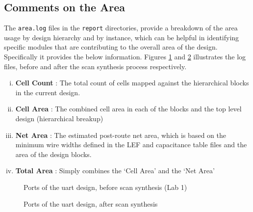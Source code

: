 \documentclass[a4paper,11pt]{article}%
\begin{document}
\subsection{Comments on the Area}

The {\tt area.log} files in the {\tt report} directories, provide a breakdown of the area usage by design hierarchy and by instance, which can be helpful in identifying specific modules that are contributing to the overall area of the design. Specifically it provides the below information\cite{genus_command_ref_2019}. Figures \ref{fig:area_lab1} and \ref{fig:area_after_scan_synthesis} illustrates the log files, before and after the scan synthesis process respectively.

\begin{enumerate}[i.]
	\item \textbf{{Cell Count}} : The total count of cells mapped against the hierarchical blocks in the current design.
	
	\item \textbf{{Cell Area}} : The combined cell area in each of the blocks and the top level design (hierarchical breakup)
	
	\item \textbf{{Net Area}} : The estimated post-route net area, which is based on the minimum wire widths defined in the LEF and capacitance table files and the area of the design blocks.
	
	\item \textbf{{Total Area}} : Simply combines the `Cell Area' and the `Net Area'
\end{enumerate}

\begin{figure}[h]
	\centering
	\caption{Ports of the \ac{uart} design, before scan synthesis (Lab 1)}
	\label{fig:area_lab1}
\end{figure}

\begin{figure}[h]
	\centering
	\caption{Ports of the \ac{uart} design, after scan synthesis}
	\label{fig:area_after_scan_synthesis}
\end{figure}
\end{document}
